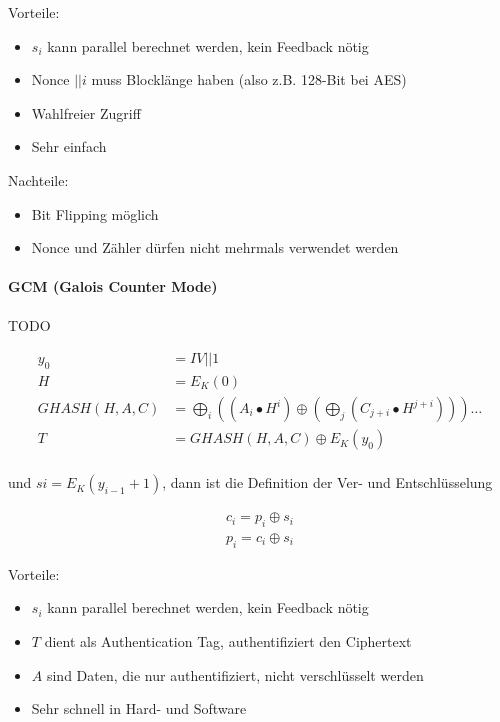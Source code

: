 Vorteile: 
\begin{itemize}
    \item $s_i$ kann parallel berechnet werden, kein Feedback nötig
    \item Nonce $|| i$ muss Blocklänge haben (also z.B. 128-Bit bei AES)
    \item Wahlfreier Zugriff
    \item Sehr einfach
\end{itemize}

Nachteile: 
\begin{itemize}
    \item Bit Flipping möglich
    \item Nonce und Zähler dürfen nicht mehrmals verwendet werden
\end{itemize}

\paragraph{GCM (Galois Counter Mode)}

TODO

\begin{align*}
    y_0 &= IV||1 \\ 
    H &= E_K(0) \\
    GHASH(H,A,C) &= \bigoplus_i \left((A_i \bullet H^i ) \oplus \left(\bigoplus_j (C_{j+i} \bullet H^{j+i} )\right)\right)\ldots\\
    T &= GHASH(H,A,C) \oplus E_K(y_0) \\
\end{align*}

und $si = E_K(y_{i-1}+1)$, dann ist die Definition der Ver- und Entschlüsselung

\begin{align*}
    c_i = p_i \oplus s_i \\
    p_i = c_i \oplus s_i
\end{align*}

Vorteile: 
\begin{itemize}
    \item $s_i$ kann parallel berechnet werden, kein Feedback nötig
    \item $T$ dient als Authentication Tag, authentifiziert den Ciphertext
    \item $A$ sind Daten, die nur authentifiziert, nicht verschlüsselt werden
    \item Sehr schnell in Hard- und Software
\end{itemize}

